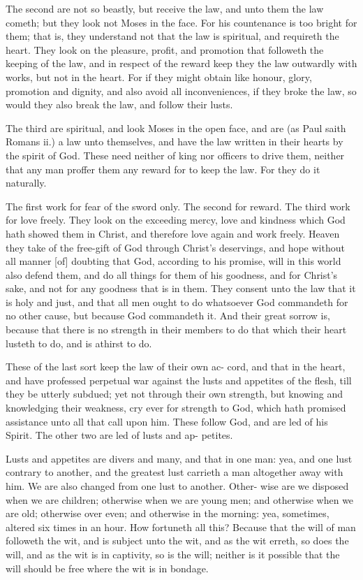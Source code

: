 \documentclass{custom}
\begin{document}
The second are not so beastly, but receive the law, and 
unto them the law cometh; but they look not Moses in 
the face. For his countenance is too bright for them;
that is, they understand not that the law is spiritual, and 
requireth the heart. They look on the pleasure, profit, 
and promotion that followeth the keeping of the law, and 
in respect of the reward keep they the law outwardly with 
works, but not in the heart. For if they might obtain 
like honour, glory, promotion and dignity, and also avoid 
all inconveniences, if they broke the law, so would they 
also break the law, and follow their lusts. 

The third are spiritual, and look Moses in the open face,
and are (as Paul saith Romans ii.) a law unto themselves,
and have the law written in their hearts by the spirit of 
God. These need neither of king nor officers to drive 
them, neither that any man proffer them any reward for 
to keep the law. For they do it naturally.

The first work for fear of the sword only. The second 
for reward. The third work for love freely. They look 
on the exceeding mercy, love and kindness which God 
hath showed them in Christ, and therefore love again and 
work freely. Heaven they take of the free-gift of God 
through Christ's deservings, and hope without all manner 
[of] doubting that God, according to his promise, will in this 
world also defend them, and do all things for them of his 
goodness, and for Christ's sake, and not for any goodness 
that is in them. They consent unto the law that it is 
holy and just, and that all men ought to do whatsoever 
God commandeth for no other cause, but because God 
commandeth it. And their great sorrow is, because that 
there is no strength in their members to do that which 
their heart lusteth to do, and is athirst to do. 

These of the last sort keep the law of their own ac- 
cord, and that in the heart, and have professed perpetual 
war against the lusts and appetites of the flesh, till they 
be utterly subdued; yet not through their own strength, 
but knowing and knowledging their weakness, cry ever 
for strength to God, which hath promised assistance 
unto all that call upon him. These follow God, and are 
led of his Spirit. The other two are led of lusts and ap- 
petites.

Lusts and appetites are divers and many, and that in 
one man: yea, and one lust contrary to another, and the 
greatest lust carrieth a man altogether away with him. 
We are also changed from one lust to another. Other- 
wise are we disposed when we are children; otherwise 
when we are young men; and otherwise when we are old;
otherwise over even; and otherwise in the morning: yea, 
sometimes, altered six times in an hour. How fortuneth 
all this? Because that the will of man followeth the wit,
and is subject unto the wit, and as the wit erreth, so does 
the will, and as the wit is in captivity, so is the will; 
neither is it possible that the will should be free where the 
wit is in bondage. 
\end{document}
